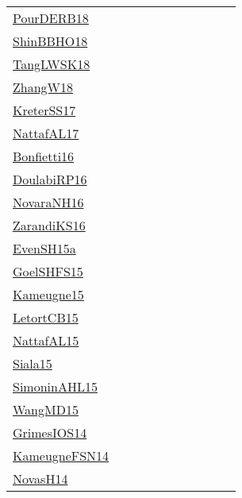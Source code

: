 {\begin{longtable}{p{3cm}p{4cm}p{2cm}p{2cm}p{2cm}p{2cm}p{2cm}p{2cm}p{2cm}p{2cm}}
\href{articles/PourDERB18.pdf}{PourDERB18}~\cite{PourDERB18} &  &  &  &  &  &  &  &  & \\
\href{articles/ShinBBHO18.pdf}{ShinBBHO18}~\cite{ShinBBHO18} &  &  &  &  &  &  &  &  & \\
\href{}{TangLWSK18}~\cite{TangLWSK18} &  &  &  &  &  &  &  &  & \\
\href{articles/ZhangW18.pdf}{ZhangW18}~\cite{ZhangW18} &  &  &  &  &  &  &  &  & \\
\href{articles/KreterSS17.pdf}{KreterSS17}~\cite{KreterSS17} &  &  &  &  &  &  &  &  & \\
\href{articles/NattafAL17.pdf}{NattafAL17}~\cite{NattafAL17} &  &  &  &  &  &  &  &  & \\
\href{}{Bonfietti16}~\cite{Bonfietti16} &  &  &  &  &  &  &  &  & \\
\href{}{DoulabiRP16}~\cite{DoulabiRP16} &  &  &  &  &  &  &  &  & \\
\href{articles/NovaraNH16.pdf}{NovaraNH16}~\cite{NovaraNH16} &  &  &  &  &  &  &  &  & \\
\href{articles/ZarandiKS16.pdf}{ZarandiKS16}~\cite{ZarandiKS16} &  &  &  &  &  &  &  &  & \\
\href{articles/EvenSH15a.pdf}{EvenSH15a}~\cite{EvenSH15a} &  &  &  &  &  &  &  &  & \\
\href{articles/GoelSHFS15.pdf}{GoelSHFS15}~\cite{GoelSHFS15} &  &  &  &  &  &  &  &  & \\
\href{articles/Kameugne15.pdf}{Kameugne15}~\cite{Kameugne15} &  &  &  &  &  &  &  &  & \\
\href{articles/LetortCB15.pdf}{LetortCB15}~\cite{LetortCB15} &  &  &  &  &  &  &  &  & \\
\href{articles/NattafAL15.pdf}{NattafAL15}~\cite{NattafAL15} &  &  &  &  &  &  &  &  & \\
\href{articles/Siala15.pdf}{Siala15}~\cite{Siala15} &  &  &  &  &  &  &  &  & \\
\href{articles/SimoninAHL15.pdf}{SimoninAHL15}~\cite{SimoninAHL15} &  &  &  &  &  &  &  &  & \\
\href{articles/WangMD15.pdf}{WangMD15}~\cite{WangMD15} &  &  &  &  &  &  &  &  & \\
\href{articles/GrimesIOS14.pdf}{GrimesIOS14}~\cite{GrimesIOS14} &  &  &  &  &  &  &  &  & \\
\href{articles/KameugneFSN14.pdf}{KameugneFSN14}~\cite{KameugneFSN14} &  &  &  &  &  &  &  &  & \\
\href{articles/NovasH14.pdf}{NovasH14}~\cite{NovasH14} &  &  &  &  &  &  &  &  & \\

\end{longtable}}
